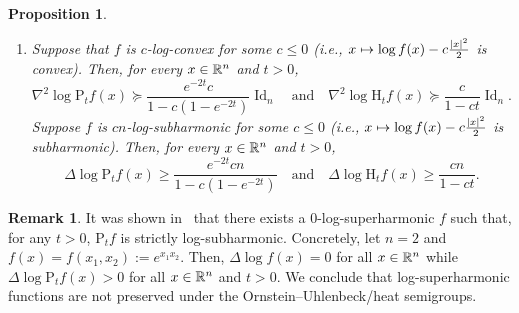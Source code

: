 \documentclass[10pt,a4paper]{amsart}
\newcommand{\R}{\mathbb R}
\DeclareMathOperator{\Id}{Id}
\newcommand{\Pheat}{\mathrm{P}}
\newcommand{\Hheat}{\mathrm{H}}
\newcommand{\dd}{n}
\newcommand{\conv}{c}
\newcommand{\density}{f}
\let\oldmapsto\mapsto
\renewcommand*{\mapsto}{\mathchoice{\longmapsto}{\oldmapsto}{\oldmapsto}{\oldmapsto}}
\let\oldin\in
\renewcommand{\in}{\mathchoice{\oldin}{\oldin}{\,\oldin\,}{\,\oldin\,}}
\newtheorem{prop}[theo]{Proposition}
\theoremstyle{definition}\newtheorem{defi}[theo]{Definition}
\newtheorem{rema}[theo]{Remark}
\begin{document}
\begin{prop}
\begin{enumerate}
\item\label{propA.2.3} Suppose that $\density$ is $\conv$-log-convex for some $\conv\le 0$ (i.e., $x\mapsto \log \density(x)-\conv\frac{|x|^2}{2}$ is convex). Then, for every $x\in \R^{\dd}$ and $t>0$,
\begin{equation}\label{eq:beta_cvx_appendix}
\nabla^2\log\Pheat_t\density(x)\succeq \frac{e^{-2t}\conv}{1-\conv(1-e^{-2t})} \Id_{\dd}\quad\text{and}\quad \nabla^2\log\Hheat_t\density(x) \succeq \frac{\conv}{1-\conv t}\Id_{\dd}.
\end{equation}
Suppose $\density$ is $\conv\dd$-log-subharmonic for some $\conv\le 0$ (i.e., $x\mapsto \log f(x)-\conv\frac{|x|^2}{2}$ is subharmonic). Then, for every $x\in \R^{\dd}$ and $t>0$,
\begin{equation}\label{eq:beta_subharmonic_appendix}
\Delta\log\Pheat_t\density(x)\ge \frac{e^{-2t}\conv\dd}{1-\conv(1-e^{-2t})}\quad\text{and}\quad \Delta \log\Hheat_t\density(x) \ge \frac{\conv\dd}{1-\conv t}.
\end{equation}
\end{enumerate}
\end{prop}
\begin{rema}
It was shown in~\cite[Remark]{MR4632741} that there exists a $0$-log-superharmonic $\density$ such that, for any $t>0$, $\Pheat_t\density$ is strictly log-subharmonic. Concretely, let $\dd=2$ and $\density(x)=\density(x_1,x_2):=e^{x_1x_2}$. Then, $\Delta\log
\density(x)=0$ for all $x\in \R^{\dd}$ while $\Delta\log
\Pheat_t\density(x)>0$ for all $x\in\R^{\dd}$ and $t>0$. We conclude that log-superharmonic functions are not preserved under the Ornstein--Uhlenbeck/heat semigroups.
\end{rema}
\end{document}
